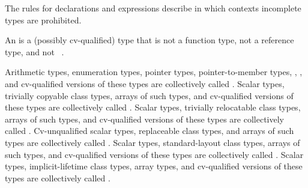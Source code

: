 \pnum
\begin{note}
The rules for declarations and expressions describe in which
contexts incomplete types are prohibited.
\end{note}

\pnum
\label{term.object.type}%
An  is a (possibly cv-qualified) type that is not
a function type, not a reference type, and not \cv{}~.

\pnum
{}%
%
%
\label{term.scalar.type}%
Arithmetic types, enumeration types,
pointer types, pointer-to-member types,
, ,
and
cv-qualified versions of these
types are collectively called
.
\label{term.trivially.copyable.type}%
Scalar types, trivially copyable class types,
arrays of such types, and cv-qualified versions of these
types are collectively called .
\label{term.trivially.relocatable.type}%
Scalar types, trivially relocatable class types,
arrays of such types, and cv-qualified versions of these
types are collectively called .
\label{term.replaceable.type}%
%
Cv-unqualified scalar types, replaceable class types, and
arrays of such types are collectively called
.
\label{term.standard.layout.type}%
Scalar types, standard-layout class
types, arrays of such types, and
cv-qualified versions of these types
are collectively called .
\label{term.implicit.lifetime.type}%
Scalar types, implicit-lifetime class types,
array types, and cv-qualified versions of these types
are collectively called .

